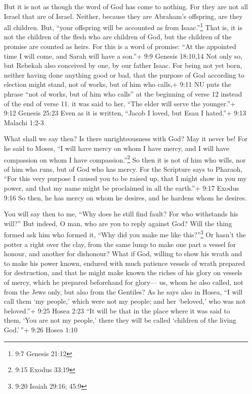  But it is not as though the word of God has come to
nothing. For they are not all Israel that are of Israel. 
Neither, because they are Abraham's offspring, are they all children.
But, ``your offspring will be accounted as from Isaac.''\footnote{9:7
  Genesis 21:12}  That is, it is not the children of the
flesh who are children of God, but the children of the promise are
counted as heirs.  For this is a word of promise: ``At the
appointed time I will come, and Sarah will have a son.''+ 9:9 Genesis
18:10,14  Not only so, but Rebekah also conceived by one,
by our father Isaac.  For being not yet born, neither
having done anything good or bad, that the purpose of God according to
election might stand, not of works, but of him who calls,+ 9:11 NU puts
the phrase ``not of works, but of him who calls'' at the beginning of
verse 12 instead of the end of verse 11.  it was said to
her, ``The elder will serve the younger.''+ 9:12 Genesis 25:23
 Even as it is written, ``Jacob I loved, but Esau I
hated.''+ 9:13 Malachi 1:2-3

 What shall we say then? Is there unrighteousness with God?
May it never be!  For he said to Moses, ``I will have mercy
on whom I have mercy, and I will have compassion on whom I have
compassion.''\footnote{9:15 Exodus 33:19}  So then it is
not of him who wills, nor of him who runs, but of God who has mercy.
 For the Scripture says to Pharaoh, ``For this very purpose
I caused you to be raised up, that I might show in you my power, and
that my name might be proclaimed in all the earth.''+ 9:17 Exodus 9:16
 So then, he has mercy on whom he desires, and he hardens
whom he desires.

 You will say then to me, ``Why does he still find fault?
For who withstands his will?''  But indeed, O man, who are
you to reply against God? Will the thing formed ask him who formed it,
``Why did you make me like this?''\footnote{9:20 Isaiah 29:16; 45:9}
 Or hasn't the potter a right over the clay, from the same
lump to make one part a vessel for honour, and another for dishonour?
 What if God, willing to show his wrath and to make his
power known, endured with much patience vessels of wrath prepared for
destruction,  and that he might make known the riches of
his glory on vessels of mercy, which he prepared beforehand for glory---
 us, whom he also called, not from the Jews only, but also
from the Gentiles?  As he says also in Hosea, ``I will call
them `my people,' which were not my people; and her `beloved,' who was
not beloved.''+ 9:25 Hosea 2:23  ``It will be that in the
place where it was said to them, `You are not my people,' there they
will be called `children of the living God.'\,''+ 9:26 Hosea 1:10

